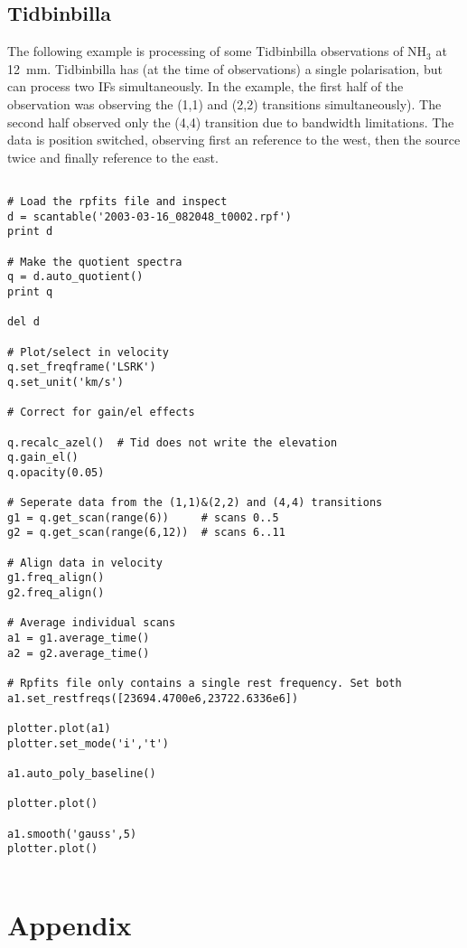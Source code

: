 \documentclass[11pt]{article}
\begin{document}
\subsection{Tidbinbilla}

The following example is processing of some
Tidbinbilla observations of NH$_3$ at 12~mm. Tidbinbilla has (at the
time of observations) a single polarisation, but can process two IFs
simultaneously. In the example, the first half of the observation was
observing the (1,1) and (2,2) transitions simultaneously). The second
half observed only the (4,4) transition due to bandwidth
limitations. The data is position switched, observing first an
reference to the west, then the source twice and finally reference to
the east.

\begin{verbatim}

# Load the rpfits file and inspect
d = scantable('2003-03-16_082048_t0002.rpf')
print d

# Make the quotient spectra
q = d.auto_quotient()
print q

del d

# Plot/select in velocity
q.set_freqframe('LSRK')
q.set_unit('km/s')

# Correct for gain/el effects

q.recalc_azel()  # Tid does not write the elevation
q.gain_el()
q.opacity(0.05)

# Seperate data from the (1,1)&(2,2) and (4,4) transitions
g1 = q.get_scan(range(6))     # scans 0..5
g2 = q.get_scan(range(6,12))  # scans 6..11

# Align data in velocity
g1.freq_align()
g2.freq_align()

# Average individual scans
a1 = g1.average_time()
a2 = g2.average_time()

# Rpfits file only contains a single rest frequency. Set both
a1.set_restfreqs([23694.4700e6,23722.6336e6])

plotter.plot(a1)
plotter.set_mode('i','t')

a1.auto_poly_baseline()

plotter.plot()

a1.smooth('gauss',5)
plotter.plot()


\end{verbatim}

\newpage

\section{Appendix}
\end{document}
